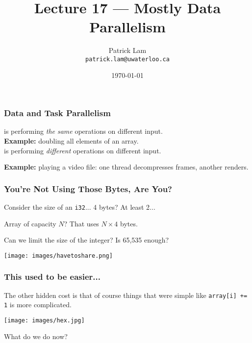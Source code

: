 

\title{Lecture 17 --- Mostly Data Parallelism }

\author{Patrick Lam \\ \small \texttt{patrick.lam@uwaterloo.ca}}
\date{\today}




\begin{frame}
  \titlepage

 \end{frame}


\begin{frame}
  \frametitle{Data and Task Parallelism}

  
      is performing \emph{the same} operations on
      different input.\\

     {\bf Example:} doubling all elements of an array.\\[1em]

      is performing \emph{different} operations
      on different input.

    {\bf Example:} playing a video file: one thread decompresses
      frames, another renders.

  
\end{frame}


\begin{frame}
\frametitle{You're Not Using Those Bytes, Are You?}

Consider the size of an \texttt{i32}... 4 bytes? At least 2...

Array of capacity $N$? That uses $N \times 4$ bytes.

Can we limit the size of the integer? Is 65,535 enough?

\begin{center}
	\texttt{[image: images/havetoshare.png]}
\end{center}

\end{frame}


\begin{frame}
\frametitle{This used to be easier...}

The other hidden cost is that of course things that were simple like \texttt{array[i] += 1} is more complicated. 

\begin{center}
	\texttt{[image: images/hex.jpg]}
\end{center}

What do we do now?

\end{frame}


